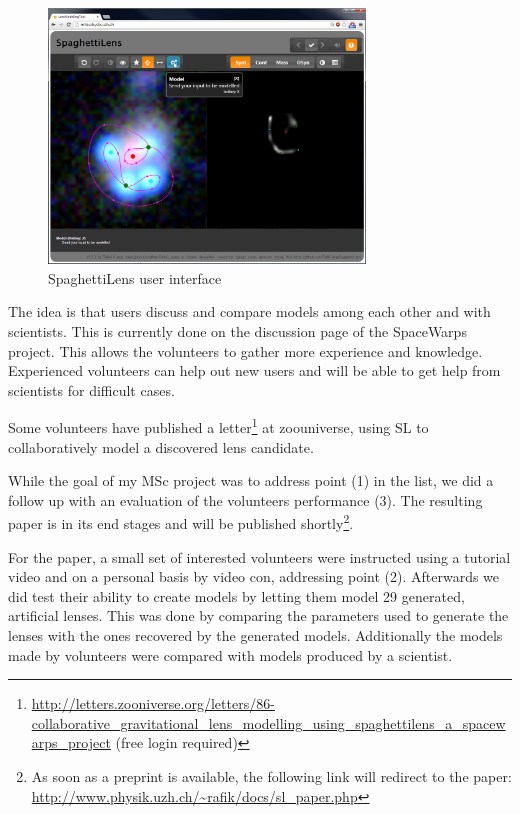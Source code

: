 \documentclass[11pt]{article}
\begin{document}
\begin{figure}
	\centering
		\includegraphics[width=0.75\textwidth]{img/client_screen.png}
	\caption{SpaghettiLens user interface}
	\label{fig:client_screen}
\end{figure}


The idea is that users discuss and compare models among each other and with scientists.
This is currently done on the discussion page of the SpaceWarps project.
This allows the volunteers to gather more experience and knowledge.
Experienced volunteers can help out new users and will be able to get help from scientists for difficult cases.

Some volunteers have published a letter\footnote{\url{http://letters.zooniverse.org/letters/86-collaborative_gravitational_lens_modelling_using_spaghettilens_a_spacewarps_project} (free login required)} at zoouniverse, using SL to collaboratively model a discovered lens candidate.

While the goal of my MSc project was to address point (1) in the list, we did a follow up with an evaluation of the volunteers performance (3).
The resulting paper is in its end stages and will be published shortly\footnote{As soon as a preprint is available, the following link will redirect to the paper:
\url{http://www.physik.uzh.ch/~rafik/docs/sl_paper.php}}.

For the paper, a small set of interested volunteers were instructed using a tutorial video and on a personal basis by video con, addressing point (2).
Afterwards we did test their ability to create models by letting them model 29 generated, artificial lenses.
This was done by comparing the parameters used to generate the lenses with the ones recovered by the generated models. Additionally the models made by volunteers were compared with models produced by a scientist.
\end{document}

